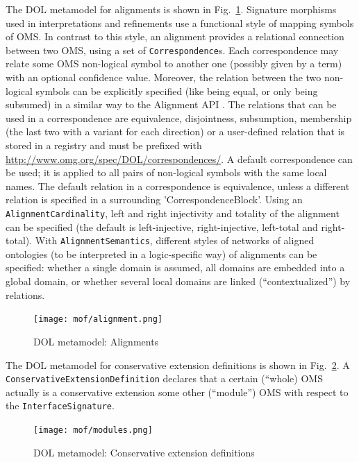 \documentclass[10pt, a4paper]{isov2}
\newcommand*{\termref}[1]{\index{#1}#1\xspace}
\newcommand*{\syntax}[1]{\texttt{#1}}
\begin{document}
The DOL metamodel for alignments is shown in 
Fig.~\ref{fig:alignment}.
Signature morphisms used in interpretations and refinements use
a functional style of mapping symbols of OMS.
In contrast to this style, an alignment provides a relational 
connection between two OMS,  using a set of \syntax{Correspondence}s. Each correspondence may relate 
some OMS non-logical symbol to another one (possibly given by a term) with an optional confidence 
value. Moreover, the relation between the two non-logical symbols can be explicitly
specified (like being equal, or only being subsumed) in a similar way to the Alignment API \cite{AlignmentAPI}. 
The relations that can be used in a correspondence are equivalence, disjointness, subsumption, membership (the last two with a
variant for each direction) or a user-defined relation that is stored in a registry and must be prefixed with
\url{http://www.omg.org/spec/DOL/correspondences/}.
A default correspondence can be used; it is applied to all pairs of non-logical symbols with 
the same local names. The default relation in a correspondence is equivalence, unless  a different 
relation is specified in a surrounding 
'CorrespondenceBlock'.
Using an \syntax{AlignmentCardinality}, left and right injectivity and totality of the
\termref{alignment} can be specified (the default is left-injective, right-injective, left-total  and right-total).
With \syntax{AlignmentSemantics}, different styles of networks of aligned ontologies (to be interpreted in 
a logic-specific way) of alignments can be specified: whether a single domain is assumed, all domains are embedded into a global domain,
or whether several local domains are linked (``contextualized'') by relations.

\begin{figure}
  \centering
    \texttt{[image: mof/alignment.png]}
  \caption{DOL metamodel: Alignments}
  \label{fig:alignment}
\end{figure}


The DOL metamodel for conservative extension definitions is shown in 
Fig.~\ref{fig:modules}.
A \syntax{ConservativeExtensionDefinition} declares that a certain (``whole) OMS
actually is a conservative extension some other (``module'') OMS with respect
to the \syntax{InterfaceSignature}.


\begin{figure}
  \centering
    \texttt{[image: mof/modules.png]}
  \caption{DOL metamodel: Conservative extension definitions}
  \label{fig:modules}
\end{figure}
\end{document}
